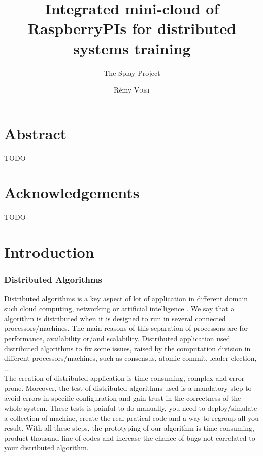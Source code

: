 \documentclass{eplmastersthesis}
\title{Integrated mini-cloud of RaspberryPIs for distributed systems training}
\subtitle{The Splay Project}
\author{Rémy \textsc{Voet}}
\begin{document}
  \maketitle

  \chapter*{Abstract}
  {\color{red} TODO}

  \chapter*{Acknowledgements}
  {\color{red} TODO}

  \tableofcontents

  \chapter{Introduction}



    \subsection{Distributed Algorithms}

      Distributed algorithms is a key aspect of lot of application in different domain such 
      cloud computing, networking or artificial intelligence \cite{DistributedArtificialIntelligence}.
      We say that a algorithm is distributed when it is designed to run in several connected processors/machines.
      The main reasons of this separation of processors are for performance, availability or/and scalability.
      Distributed application used distributed algorithms to fix some issues, raised by the computation division   
      in different processors/machines, such as consensus, atomic commit, leader election, ...  \\

      The creation of distributed application is time consuming, complex and error prone. Moreover,
      the test of distributed algorithms used is a mandatory step to avoid errors in specific configuration and 
      gain trust in the correctness of the whole system. These tests is painful to do manually, you need 
      to deploy/simulate a collection of machine, create the real pratical code and a way to regroup all you result. 
      With all these steps, the prototyping of our algorithm is time consuming, product thousand line of codes and increase
      the chance of bugs not correlated to your distributed algorithm. \\
\end{document}
